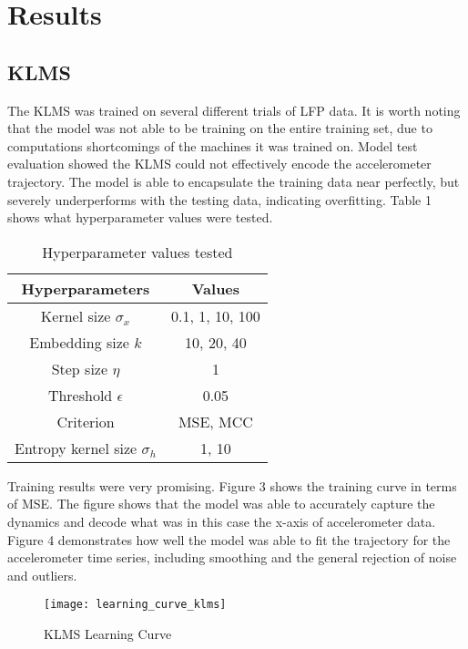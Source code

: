 \documentclass[12pt]{article}
\begin{document}
\section{Results}

\subsection{KLMS}

The KLMS was trained on several different trials of LFP data. It is worth noting that the model was not able to be training on the entire training set, due to computations shortcomings of the machines it was trained on. Model test evaluation showed the KLMS could not effectively encode the accelerometer trajectory. The model is able to encapsulate the training data near perfectly, but severely underperforms with the testing data, indicating overfitting. Table 1 shows what hyperparameter values were tested.

\begin{table}[h!]
    \begin{center}
    \begin{tabular}{ |c|c| } 
    \hline
        Hyperparameters & Values\\ 
    \hline
        Kernel size $\sigma_x$ & 0.1, 1, 10, 100 \\ 
        Embedding size $k$ & 10, 20, 40\\
        Step size $\eta$ & 1 \\
        Threshold $\epsilon$ & 0.05\\
        Criterion & MSE, MCC\\
        Entropy kernel size $\sigma_h$ & 1, 10\\
    \hline
    \end{tabular}
    \end{center}
    \caption{Hyperparameter values tested}
    \label{table:1}
\end{table}

Training results were very promising. Figure 3 shows the training curve in terms of MSE. The figure shows that the model was able to accurately capture the dynamics and decode what was in this case the x-axis of accelerometer data. Figure 4 demonstrates how well the model was able to fit the trajectory for the accelerometer time series, including smoothing and the general rejection of noise and outliers.

\begin{figure}[h]
\caption{KLMS Learning Curve}
\centering
\texttt{[image: learning\_curve\_klms]}
\end{figure}
\end{document}
